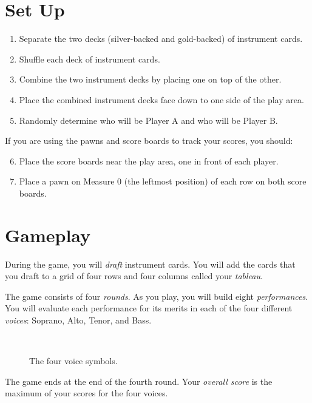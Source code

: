 \documentclass[a6paper, 12pt, parskip=half, DIV=14]{scrartcl}
\begin{document}
\section*{Set Up}
\begin{enumerate}[leftmargin=4ex]
  \item Separate the two decks (silver-backed and gold-backed) of instrument cards. 
  \item Shuffle each deck of instrument cards.
  \item Combine the two instrument decks by placing one on top of the other.
  \item Place the combined instrument decks face down to one side of the play area.
  \item Randomly determine who will be Player A and who will be Player B.
 \end{enumerate}
 If you are using the pawns and score boards to track your scores, you should:
\begin{enumerate}[leftmargin=4ex]
  \setcounter{enumi}{5}
  \item Place the score boards near the play area, one in front of each player.
  \item Place a pawn on Measure 0 (the leftmost position) of each row on both score boards. 
\end{enumerate}




\newpage
\enlargethispage{1.75\baselineskip}
\section*{Gameplay}
During the game, you will \emph{draft} instrument cards. You will add the cards that you draft to a grid of four rows and four columns called your \emph{tableau}.

The game consists of four \emph{rounds}. As you play, you will build eight \emph{performances}.
You will evaluate each performance for its merits in each of the four different \emph{voices}: Soprano, Alto, Tenor, and Bass.
{

\begin{figure}[h]
\centering
\Huge
{} \ \  \ \  \ \ 
\caption*{The four voice symbols.}
\end{figure}
}
The game ends at the end of the fourth round. Your \emph{overall score} is the maximum of your scores for the four voices.
\end{document}
